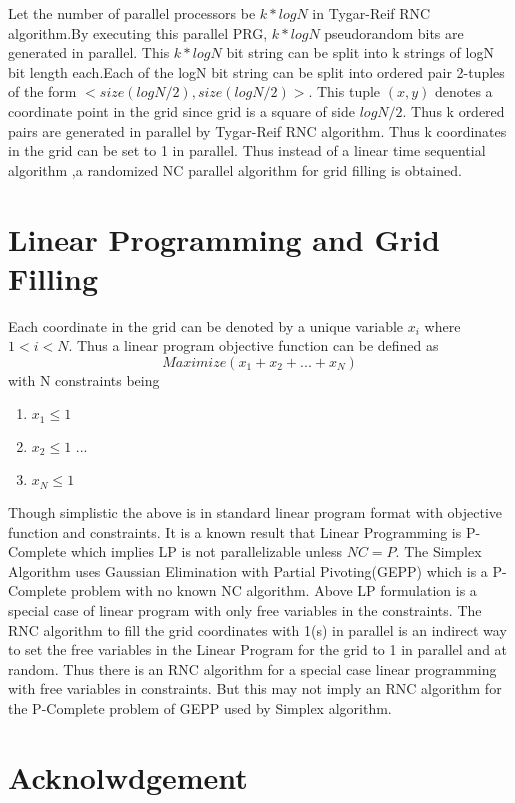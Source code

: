 \documentclass[11pt,onecolumn]{article}
\begin{document}
Let the number of parallel processors be $k*logN$ in Tygar-Reif RNC algorithm.By executing this parallel PRG, $k*logN$ pseudorandom bits are generated in parallel. This $k*logN$ bit string can be split into k strings of logN bit length each.Each of the logN bit string can be split into ordered pair 2-tuples of the form $<size(logN/2), size(logN/2)>$. This tuple $(x,y)$ denotes a coordinate point in the grid since grid is a square of side $logN/2$. Thus k ordered pairs are generated in parallel by Tygar-Reif RNC algorithm. Thus k coordinates in the grid can be set to 1 in parallel. Thus instead of a linear time sequential algorithm ,a randomized NC parallel algorithm for grid filling is obtained.

\section{Linear Programming and Grid Filling}

Each coordinate in the grid can be denoted by a unique variable $x_{i}$ where $ 1 < i< N$. Thus a linear program objective function can be defined as 
\begin{equation}
Maximize ( x_{1} + x_{2} + ... + x_{N} )
\end{equation}
with N constraints being
\begin{enumerate}
\item $x_{1} \leq 1 $
\item $x_{2} \leq 1 $
...    
\item $x_{N} \leq 1 $
\end{enumerate}

Though simplistic the above is in standard linear program format with objective function and constraints. It is a known result that Linear Programming is P-Complete which implies LP is not parallelizable unless $NC=P$. The Simplex Algorithm uses Gaussian Elimination with Partial Pivoting(GEPP) which is a P-Complete problem with no known NC algorithm. Above LP formulation is a special case of linear program with only free variables in the constraints. The RNC algorithm to fill the grid coordinates with 1(s) in parallel is an indirect way to set the free variables in the Linear Program for the grid to 1 in parallel and at random. Thus there is an RNC algorithm for a special case linear programming with free variables in constraints. But this may not imply an RNC algorithm for the P-Complete problem of GEPP used by Simplex algorithm.
\section{Acknolwdgement}
\end{document}
